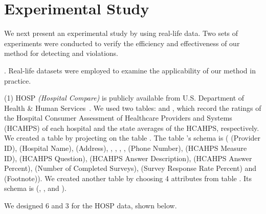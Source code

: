 \section{Experimental Study}
\label{sec-exp}

We next present an experimental study by using real-life data. Two sets of experiments were conducted to verify the efficiency and effectiveness of our method for detecting \pCFDs and \pCINDs violations.

. Real-life datasets were employed to examine the applicability of our method in practice.

(1) HOSP \textit{(Hospital Compare)} is publicly available from U.S. Department of Health
\& Human Services~\cite{hosp}. We used two tables:  and , which record the ratings of the Hospital Consumer Assessment of Healthcare Providers and Systems (HCAHPS) of each hospital and the state averages of the HCAHPS, respectively. We created a table  by projecting on the table . The table 's schema is ( (Provider ID),  (Hospital Name),  (Address), , , , ,  (Phone Number),  (HCAHPS Measure ID),  (HCAHPS Question),  (HCAHPS Answer Description),  (HCAHPS Answer Percent),  (Number of Completed Surveys),  (Survey Response Rate Percent) and  (Footnote)). We created another table  by choosing 4 attributes from table . Its schema is (, ,  and ).

We designed 6 \pCFDs and 3 \pCINDs for the HOSP data, shown below.

